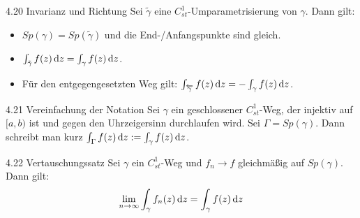 \begin{satz}{4.20 Invarianz und Richtung}
Sei $\tilde{\gamma}$ eine $C_{st}^1$-Umparametrisierung von $\gamma$. Dann gilt:
\begin{itemize}
    \item[i)] $Sp(\gamma) = Sp(\tilde{\gamma})$ und die End-/Anfangspunkte sind gleich.
    \item[ii)] $\int_{\tilde{\gamma}} f(z) \, \mathrm{d}z = \int_{\gamma} f(z) \, \mathrm{d}z$.
    \item[iii)] Für den entgegengesetzten Weg gilt: $\int_{\overleftarrow{\gamma}} f(z) \, \mathrm{d}z = -\int_{\gamma} f(z) \, \mathrm{d}z$.
\end{itemize}
\end{satz}

\begin{satz}{4.21 Vereinfachung der Notation}
Sei $\gamma$ ein geschlossener $C_{st}^1$-Weg, der injektiv auf $[a,b)$ ist und gegen den Uhrzeigersinn durchlaufen wird. Sei $\Gamma = Sp(\gamma)$. Dann schreibt man kurz $\int_{\Gamma} f(z) \, \mathrm{d}z := \int_{\gamma} f(z) \, \mathrm{d}z$. 
\end{satz}

\begin{satz}{4.22 Vertauschungssatz}
Sei $\gamma$ ein $C_{st}^1$-Weg und $f_n \to f$ gleichmäßig auf $Sp(\gamma)$. Dann gilt:
\[
    \lim_{n \to \infty} \int_\gamma f_n(z) \, \mathrm{d}z = \int_\gamma f(z) \, \mathrm{d}z
\]
\end{satz}